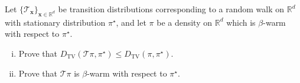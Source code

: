 Let $\{\mathcal{T}_{\mathbf{x}}\}_{\mathbf{x} \in \mathbb{R}^d}$ be transition distributions corresponding to a random walk on $\mathbb{R}^d$ with stationary distribution $\pi^\star$, and let $\pi$ be a density on $\mathbb{R}^d$ which is $\beta$-warm with respect to $\pi^\star$.

\begin{enumerate}[(i)]
  \item Prove that $D_{\mathrm{TV}}(\mathcal{T}\pi, \pi^\star) \leq D_{\mathrm{TV}}(\pi, \pi^\star)$.
  \item Prove that $\mathcal{T}\pi$ is $\beta$-warm with respect to $\pi^\star$.
\end{enumerate}
